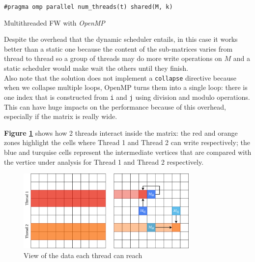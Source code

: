 \begin{algorithm}[h!]

\SetAlgoLined

\texttt{\#pragma omp parallel num\_threads(t) shared(M, k)} \\

 
\caption{Multithreaded FW with \emph{OpenMP}}\label{alg:omp}
\end{algorithm}


Despite the overhead that the dynamic scheduler entails, in this case it works better than a static one because the
content of the sub-matrices varies from thread to thread so a group of threads may do more write operations on $M$ and a
static scheduler would make wait the others until they finish. 
 \\
Also note that the solution does not implement a \texttt{collapse} directive because when we collapse multiple loops, OpenMP turns them into a single loop: there is one
index that is constructed from \texttt{i} and \texttt{j} using division and modulo operations. This can
have huge impacts on the performance because of this overhead, especially if the matrix is really wide.

\textbf{Figure \ref*{fig:threads}} shows how 2 threads interact inside the matrix: the red and orange zones highlight the cells where
Thread 1 and Thread 2 can write respectively; the blue and turquise cells represent the intermediate vertices that are compared
with the vertice under analysis for Thread 1 and Thread 2 respectively.

\begin{figure}[h!]
\centering                                                                        
\includegraphics[width=3.5in]{diagrams/openmp-threads}
\captionsetup{justification=centering,margin=2cm}                                                                                                                                   
\caption{View of the data each thread can reach}                                                                                                                                            
\label{fig:threads}                                                                                                                                                           
\end{figure}


